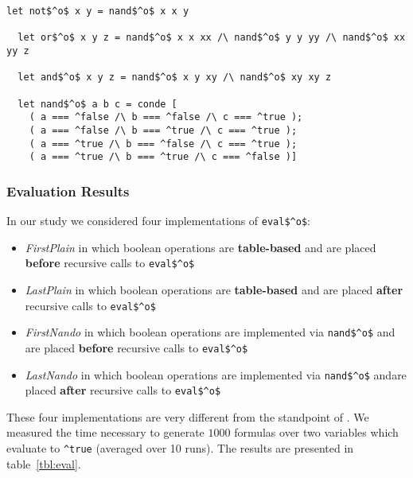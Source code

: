 \begin{figure*}[!h]
  \centering
  \begin{minipage}{0.85\textwidth}
    \begin{lstlisting}[label={not:nando}, caption={Implementation of boolean operation via \lstinline{nand}}, captionpos=b, frame=tb]
  let not$^o$ x y = nand$^o$ x x y

  let or$^o$ x y z = nand$^o$ x x xx /\ nand$^o$ y y yy /\ nand$^o$ xx yy z

  let and$^o$ x y z = nand$^o$ x y xy /\ nand$^o$ xy xy z

  let nand$^o$ a b c = conde [
    ( a === ^false /\ b === ^false /\ c === ^true );
    ( a === ^false /\ b === ^true /\ c === ^true );
    ( a === ^true /\ b === ^false /\ c === ^true );
    ( a === ^true /\ b === ^true /\ c === ^false )]
    \end{lstlisting}
  \end{minipage}
\end{figure*}

\subsubsection{Evaluation Results}
In our study we considered four implementations of \lstinline{eval$^o$}:
\begin{itemize}
  \item \emph{FirstPlain} in which boolean operations are \textbf{table-based} and are placed \textbf{before} recursive calls to \lstinline{eval$^o$}
  \item \emph{LastPlain} in which boolean operations are \textbf{table-based} and are placed \textbf{after} recursive calls to \lstinline{eval$^o$}
  \item \emph{FirstNando} in which boolean operations are implemented via \lstinline{nand$^o$} and are placed \textbf{before} recursive calls to \lstinline{eval$^o$}
  \item \emph{LastNando} in which boolean operations are implemented via \lstinline{nand$^o$} andare placed \textbf{after} recursive calls to \lstinline{eval$^o$}

\end{itemize}

These four implementations are very different from the standpoint of \ecce.
We measured the time necessary to generate $1000$ formulas over two variables which evaluate to \lstinline{^true} (averaged over 10 runs).
The results are presented in table~\ref{tbl:eval}.


